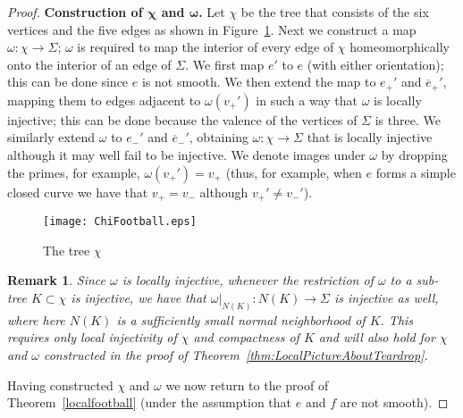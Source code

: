 \documentclass[12pt,reqno]{amsart}
\theoremstyle{plain}
\theoremstyle{definition}
\numberwithin{subcase}{case}
\theoremstyle{plain}
\newtheorem{remark}[thm]{Remark}
\theoremstyle{definition}
\def\scl[#1][#2]{{\scalebox{#1}{#2}}}
\def\oep{\overline{e}_{+}}
\def\oem{\overline{e}_{-}}
\def\ep{e_{+}}
\def\eem{e_{-}}
\def\vpp{v_{++}}
\def\vmm{v_{--}}
\def\ovpp{\overline{v}_{++}}
\def\ovmm{\overline{v}_{--}}
\def\vp{v_{+}}
\def\vm{v_{-}}
\def\ovpp{\overline{v}_{++}}
\def\ovmm{\overline{v}_{--}}
\begin{document}
\begin{proof}
\bigskip
\noindent
{\bf Construction of \(\boldsymbol{\chi}\) and \(\boldsymbol{\omega}\).} 
\label{ConstructionChiOmega}
Let \(\chi\) be the tree that consists of the six vertices and the five edges as shown in Figure~\ref{figure:chiForFootball}. Next we construct a map \(\omega:\chi \to \Sigma\); \(\omega\) is required to map the interior of every edge of \(\chi\)  homeomorphically  onto the interior of an edge of \(\Sigma\). We first map \(e'\) to \(e\) (with either orientation); this can be done since \(e\) is not smooth.  We then extend the map to \(\ep'\) and \(\oep'\), mapping them to edges adjacent to \(\omega(\vp')\) in such a way that \(\omega\) is locally injective; this can be done because the valence of the vertices of \(\Sigma\) is three. We similarly extend \(\omega\) to \(\eem'\) and \(\oem'\), obtaining \(\omega:\chi \to \Sigma\) that is locally injective although it may well fail to be injective.  We denote images under \(\omega\) by dropping the primes, for example, \(\omega(\vp') = \vp\) (thus, for example, when \(e\) forms a simple closed curve we have that \(\vp = \vm\) although  \(\vp' \not= \vm'\)).
\def\sizee{.7}
\begin{figure}[h!]
\psfrag{1}{\scl[\sizee][$\vm'$]}
\psfrag{2}{\scl[\sizee][$\vp'$]}
\psfrag{3}{\scl[\sizee][\(\oem'\)]}
\psfrag{4}{\scl[\sizee][\(\eem'\)]}
\psfrag{5}{\scl[\sizee][\(\ovmm'\)]}
\psfrag{6}{\scl[\sizee][\(\vmm'\)]}
\psfrag{7}{\scl[\sizee][\(\vpp'\)]}
\psfrag{8}{\scl[\sizee][\(\ep'\)]}
\psfrag{9}{\scl[\sizee][\(\oep'\)]}
\psfrag{a}{\scl[\sizee][\(\ovpp'\)]}
\psfrag{f}{\scl[\sizee][$e'$]}
\hspace{-1cm}
\centerline{\texttt{[image: ChiFootball.eps]}}
\caption{The tree $\chi$}
\label{figure:chiForFootball}
\end{figure}


\begin{remark}{\rm
\label{remark:embedding_in_neighborhood}
Since \(\omega\) is locally injective, whenever the restriction of \(\omega\) to a sub-tree \(K \subset \chi\) is injective, we have that \(\omega|_{N(K)}:N(K) \to \Sigma\) is injective as well, where here \(N(K)\) is a sufficiently small normal neighborhood of \(K\). This requires only local injectivity of \(\chi\) and compactness of \(K\) and will also hold for \(\chi\) and \(\omega\) constructed in the proof of Theorem~\ref{thm:LocalPictureAboutTeardrop}.}
\end{remark}

\bigskip
\noindent Having constructed \(\chi\) and \(\omega\) we now return to the proof of Theorem~\ref{localfootball} (under the assumption that \(e\) and \(f\) are not smooth).


\end{proof}
\end{document}
